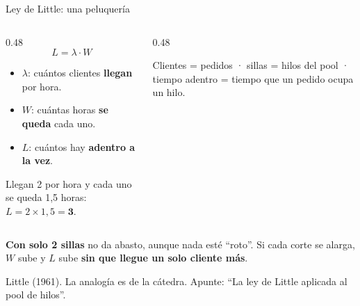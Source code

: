 \documentclass[institutional,screen,none]{ua-engineering-v6-beamer}
\begin{document}
\begin{frame}{Ley de Little: una peluquería}
\begin{columns}[T,onlytextwidth]
\begin{column}{0.48\textwidth}
\small
\[
L = \lambda \cdot W
\]
\begin{itemize}
\item $\lambda$: cuántos clientes \textbf{llegan} por hora.
\item $W$: cuántas horas \textbf{se queda} cada uno.
\item $L$: cuántos hay \textbf{adentro a la vez}.
\end{itemize}

Llegan 2 por hora y cada uno se queda 1,5 horas: $L = 2 \times 1{,}5 = \mathbf{3}$.
\end{column}
\begin{column}{0.48\textwidth}
\begin{center}
\end{center}
{\small Clientes = pedidos · sillas = hilos del pool · tiempo adentro = tiempo que un pedido ocupa un hilo.}
\end{column}
\end{columns}

{\color{UAIngOrange}\textbf{Con solo 2 sillas}} no da abasto, aunque nada esté ``roto''. Si cada corte se alarga, $W$ sube y $L$ sube \textbf{sin que llegue un solo cliente más}.

{\scriptsize\color{UAIngMuted}Little (1961). La analogía es de la cátedra. Apunte: ``La ley de Little aplicada al pool de hilos''.}
\end{frame}
\end{document}
